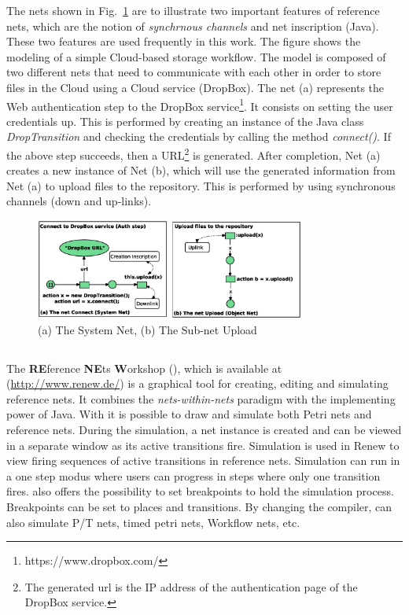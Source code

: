 The nets shown in Fig.~\ref{figure:refnets} are to illustrate two important features of reference nets, which are the notion of \emph{synchrnous channels} and net inscription (Java).
%
These two features are used frequently in this work.
%
The figure shows the modeling of a simple Cloud-based storage workflow.
%
The model is composed of two different nets that need to communicate with each other in order to store files in the Cloud using a Cloud service (DropBox).
%
The net (a) represents the Web authentication step to the DropBox service\footnote{https://www.dropbox.com/}.
%
It consists on setting the user credentials up.
%
This is performed by creating an instance of the Java class \textit{DropTransition} and checking the credentials by calling the method \emph{connect()}.
%
If the above step succeeds, then a URL\footnote{The generated url is the IP address of the authentication page of the DropBox service.} is generated. 
%
After completion, Net (a) creates a new instance of Net (b), which will use the generated information from Net (a) to upload files to the repository.
%
This is performed by using synchronous channels (down and up-links).

\begin{figure}[!t]
 \centering
  \includegraphics[width=0.79\textwidth,height=0.23\textheight]{SystemObjectNet}
\caption{(a) The System Net, (b) The Sub-net Upload}
\label{figure:refnets}
\end{figure}





\subsection{\Renew{}}
%
The \textbf{RE}ference \textbf{NE}ts \textbf{W}orkshop (\Renew{}), which is available at (\url{http://www.renew.de/}) is a graphical tool for creating, editing and simulating reference nets.
%
It combines the \textit{nets-within-nets} paradigm with the implementing power of Java.
%
%
%
With \Renew{} it is possible to draw and simulate both Petri nets and reference nets. 
%
%
%
During the simulation, a net instance is created and can be viewed in a separate window as its active transitions fire.
%
Simulation is used in Renew to view firing sequences of active transitions in reference nets.
%
Simulation can run in a one step modus where users can progress in steps where only one transition fires. 
%
\Renew{} also offers the possibility to set breakpoints to hold the simulation process.
%
Breakpoints can be set to places and transitions. 
%
By changing the compiler, \Renew{} can also simulate P/T nets, timed petri nets, Workflow nets, etc.

